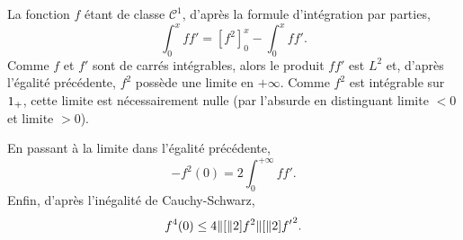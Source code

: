 \begin{solution}
La fonction $f$ étant de classe $\mathscr{C}^1$, d'après la formule d'intégration par parties,
\[
\int_0^x f f' = \left[f^2\right]_0^x - \int_0^x f f'.
\]
Comme $f$ et $f'$ sont de carrés intégrables, alors le produit $f f'$ est $L^2$ et, d'après l'égalité précédente, $f^2$ possède une limite en $+\infty$. Comme $f^2$ est intégrable sur $1_+$, cette limite est nécessairement nulle (par l'absurde en distinguant limite $< 0$ et limite $> 0$).

En passant à la limite dans l'égalité précédente,
\[
-f^2(0) = 2 \int_0^{+\infty} f f'.
\]
Enfin, d'après l'inégalité de Cauchy-Schwarz,
\[
f^4(0) \leq 4 \Vert [ \Vert2]{f}^2 \Vert [ \Vert2]{f'}^2.
\]
\end{solution}

